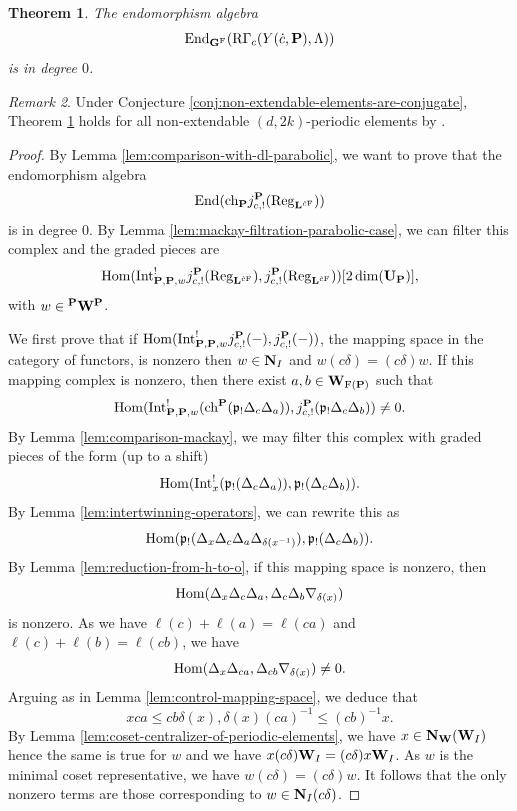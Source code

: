 \documentclass[article, 10pt, oneside, reqno]{amsart}
\theoremstyle{plain}
\newtheorem{thm}{Theorem}[subsection]
\theoremstyle{definition}
\theoremstyle{remark}
\newtheorem{rque}[thm]{Remark}
\begin{document}
\begin{thm}\label{thm:vanishing-non-extendable-elements}
The endomorphism algebra 
$$\mathrm{End}_{\mathbf{G}^{\mathrm{F}}}(\mathrm{R\Gamma}_c(Y(\dot{c}, \mathbf{P}), \Lambda))$$ 
is in degree $0$. 
\end{thm}

\begin{rque}
Under Conjecture \ref{conj:non-extendable-elements-are-conjugate}, Theorem \ref{thm:vanishing-non-extendable-elements} holds for all non-extendable $(d,2k)$-periodic elements by \cite[Lemma 7.22]{DigneMichelParabolic}.
\end{rque}

\begin{proof}
By Lemma \ref{lem:comparison-with-dl-parabolic}, we want to prove that the endomorphism algebra
$$\mathrm{End}(\mathrm{ch}_{\mathbf{P}}j_{c,!}^{\mathbf{P}}(\mathrm{Reg}_{\mathbf{L}^{\dot{c}\mathrm{F}}}))$$
is in degree $0$. By Lemma \ref{lem:mackay-filtration-parabolic-case}, we can filter this complex and the graded pieces are 
$$\mathrm{Hom}(\mathrm{Int}_{\mathbf{P}, \mathbf{P},w}^!j_{c,!}^{\mathbf{P}}(\mathrm{Reg}_{\mathbf{L}^{\dot{c}\mathrm{F}}}), j_{c,!}^{\mathbf{P}}(\mathrm{Reg}_{\mathbf{L}^{\dot{c}\mathrm{F}}}))[2\dim(\mathbf{U}_{\mathbf{P}})],$$
with $w \in {^{\mathbf{P}}}\mathbf{W}^{\mathbf{P}}$.

We first prove that if $\mathrm{Hom}(\mathrm{Int}_{\mathbf{P}, \mathbf{P},w}^!j_{c,!}^{\mathbf{P}}(-), j_{c,!}^{\mathbf{P}}(-))$, the mapping space in the category of functors, is nonzero then $w \in \mathbf{N}_I$ and $w(c\delta) = (c\delta)w$. If this mapping complex is nonzero, then there exist $a,b \in \mathbf{W}_{\mathrm{F}(\mathbf{P})}$ such that 
$$\mathrm{Hom}(\mathrm{Int}_{\mathbf{P}, \mathbf{P},w}^!(\mathrm{ch}^{\mathbf{P}}(\mathfrak{p}_!\Delta_c\Delta_a)), j_{c,!}^{\mathbf{P}}(\mathfrak{p}_!\Delta_c\Delta_b)) \neq 0.$$
By Lemma \ref{lem:comparison-mackay}, we may filter this complex with graded pieces of the form (up to a shift)
$$\mathrm{Hom}(\mathrm{Int}_{x}^!(\mathfrak{p}_!(\Delta_c\Delta_a)), \mathfrak{p}_!(\Delta_c\Delta_b)).$$
By Lemma \ref{lem:intertwinning-operators}, we can rewrite this as
$$\mathrm{Hom}(\mathfrak{p}_!(\Delta_x\Delta_c\Delta_a\Delta_{\delta(x^{-1})}), \mathfrak{p}_!(\Delta_c\Delta_b)).$$
By Lemma \ref{lem:reduction-from-h-to-o}, if this mapping space is nonzero, then 
$$\mathrm{Hom}(\Delta_x\Delta_c\Delta_a, \Delta_c\Delta_b\nabla_{\delta(x)})$$
is nonzero. As we have $\ell(c) + \ell(a) = \ell(ca)$ and $\ell(c) + \ell(b) = \ell(cb)$, we have 
$$\mathrm{Hom}(\Delta_x\Delta_{ca}, \Delta_{cb}\nabla_{\delta(x)}) \neq 0.$$
Arguing as in Lemma \ref{lem:control-mapping-space}, we deduce that 
$$xca \leq cb\delta(x), \delta(x)(ca)^{-1} \leq (cb)^{-1}x.$$
By Lemma \ref{lem:coset-centralizer-of-periodic-elements}, we have $x \in \mathbf{N}_{\mathbf{W}}(\mathbf{W}_I)$ hence the same is true for $w$ and we have $x(c\delta)\mathbf{W}_{I} = (c\delta)x\mathbf{W}_{I}$. As $w$ is the minimal coset representative, we have $w(c\delta) = (c\delta)w$. It follows that the only nonzero terms are those corresponding to $w \in \mathbf{N}_{I}(c\delta)$.


\end{proof}
\end{document}
